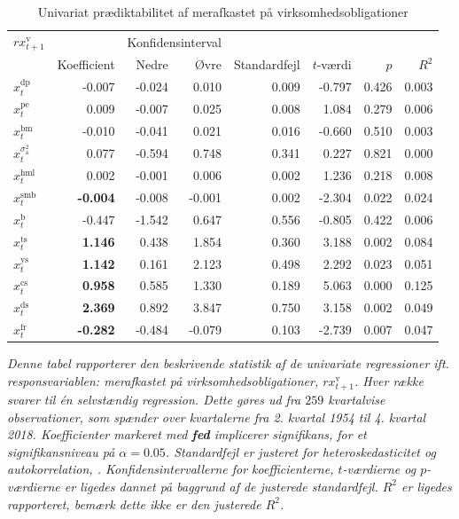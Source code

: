 \documentclass[
  a4paper,
  oneside]{memoir}
\begin{document}
\begin{table}[H]
\caption{\label{tab:UNI-v}Univariat prædiktabilitet af merafkastet på virksomhedsobligationer}
\centering
\begin{threeparttable}
\begin{tabular}[t]{lrrrrrrr}
\toprule
\multicolumn{1}{c}{$rx_{t+1}^{\text{v}}$} & \multicolumn{1}{c}{ } & \multicolumn{2}{c}{Konfidensinterval} & \multicolumn{4}{c}{ } \\
\cmidrule(l{3pt}r{3pt}){1-1} \cmidrule(l{3pt}r{3pt}){3-4}
  & Koefficient & Nedre & Øvre & Standardfejl & $t$-værdi & $p$ & $R^2$\\
\midrule
\rowcolor{gray!6}  $x_t^{\text{dp}}$ & -0.007 & -0.024 & 0.010 & 0.009 & -0.797 & 0.426 & 0.003\\
$x_t^{\text{pe}}$ & 0.009 & -0.007 & 0.025 & 0.008 & 1.084 & 0.279 & 0.006\\
\rowcolor{gray!6}  $x_t^{\text{bm}}$ & -0.010 & -0.041 & 0.021 & 0.016 & -0.660 & 0.510 & 0.003\\
$x_t^{\sigma_{\text{a}}^2}$ & 0.077 & -0.594 & 0.748 & 0.341 & 0.227 & 0.821 & 0.000\\
\rowcolor{gray!6}  $x_t^{\text{hml}}$ & 0.002 & -0.001 & 0.006 & 0.002 & 1.236 & 0.218 & 0.008\\
$x_t^{\text{smb}}$ & \textbf{-0.004} & -0.008 & -0.001 & 0.002 & -2.304 & 0.022 & 0.024\\
\rowcolor{gray!6}  $x_t^{\text{b}}$ & -0.447 & -1.542 & 0.647 & 0.556 & -0.805 & 0.422 & 0.006\\
$x_t^{\text{ts}}$ & \textbf{ 1.146} & 0.438 & 1.854 & 0.360 & 3.188 & 0.002 & 0.084\\
\rowcolor{gray!6}  $x_t^{\text{ys}}$ & \textbf{ 1.142} & 0.161 & 2.123 & 0.498 & 2.292 & 0.023 & 0.051\\
$x_t^{\text{cs}}$ & \textbf{ 0.958} & 0.585 & 1.330 & 0.189 & 5.063 & 0.000 & 0.125\\
\rowcolor{gray!6}  $x_t^{\text{ds}}$ & \textbf{ 2.369} & 0.892 & 3.847 & 0.750 & 3.158 & 0.002 & 0.049\\
$x_t^{\text{fr}}$ & \textbf{-0.282} & -0.484 & -0.079 & 0.103 & -2.739 & 0.007 & 0.047\\
\bottomrule
\end{tabular}
\begin{tablenotes}
\item \textit{Denne tabel rapporterer den beskrivende statistik af de univariate regressioner ift. responsvariablen: merafkastet på virksomhedsobligationer, $rx_{t+1}^{\text{v}}$. Hver række svarer til én selvstændig regression. Dette gøres ud fra $259$ kvartalvise observationer, som spænder over kvartalerne fra 2. kvartal 1954 til 4. kvartal 2018. Koefficienter markeret med \textbf{fed} implicerer signifikans, for et signifikansniveau på $\alpha=0.05$. Standardfejl er justeret for heteroskedasticitet og autokorrelation, \citep{Newey1987}. Konfidensintervallerne for koefficienterne, $t$-værdierne og $p$-værdierne er ligedes dannet på baggrund af de justerede standardfejl. $R^2$ er ligedes rapporteret, bemærk dette ikke er den justerede $R^2$.}
\end{tablenotes}
\end{threeparttable}
\end{table}
\end{document}
